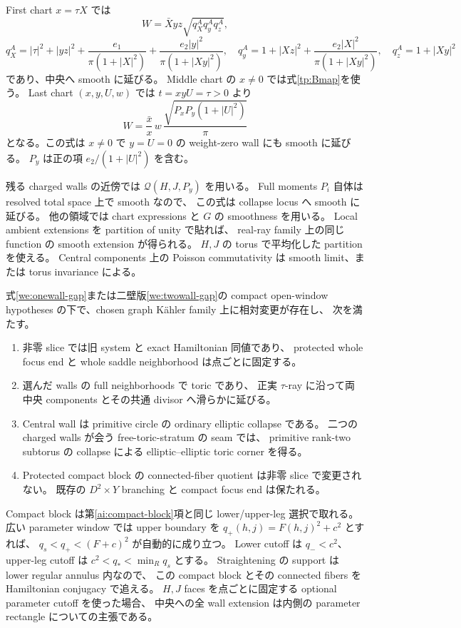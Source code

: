 First chart $x=\tau X$ では
\[
 W=\bar Xyz\sqrt{q_X^Aq_y^Aq_z^A},
\]
\[
 q_X^A=|\tau|^2+|yz|^2+\frac{e_1}{\pi(1+|X|^2)}
                   +\frac{e_2|y|^2}{\pi(1+|Xy|^2)},\quad
 q_y^A=1+|Xz|^2+\frac{e_2|X|^2}{\pi(1+|Xy|^2)},\quad
 q_z^A=1+|Xy|^2
\]
であり、中央へ smooth に延びる。
Middle chart の $x\ne0$ では式\eqref{tp:Bmap}を使う。
Last chart $(x,y,U,w)$ では $t=xyU=\tau>0$ より
\begin{equation}\label{we:last-chart}
 W=\frac{\bar x}{x}\,w\,\frac{\sqrt{P_xP_y(1+|U|^2)}}{\pi}
\end{equation}
となる。この式は $x\ne0$ で $y=U=0$ の weight-zero wall にも smooth に延びる。
$P_y$ は正の項 $e_2/(1+|U|^2)$ を含む。

残る charged walls の近傍では $\mathcal Q(H,J,P_y)$ を用いる。
Full moments $P_i$ 自体は resolved total space 上で smooth なので、
この式は collapse locus へ smooth に延びる。
他の領域では chart expressions と $G$ の smoothness を用いる。
Local ambient extensions を partition of unity で貼れば、
real-ray family 上の同じ function の smooth extension が得られる。
$H,J$ の torus で平均化した partition を使える。
Central components 上の Poisson commutativity は smooth limit、または torus invariance による。

\begin{theorem}\label{we:actual-filling}
式\eqref{we:onewall-gap}または二壁版\eqref{we:twowall-gap}の
compact open-window hypotheses の下で、chosen graph Kähler family 上に相対変更が存在し、
次を満たす。
\begin{enumerate}
\item 非零 slice では旧 system と exact Hamiltonian 同値であり、
 protected whole focus end と whole saddle neighborhood は点ごとに固定する。
\item 選んだ walls の full neighborhoods で toric であり、
 正実 $\tau$-ray に沿って両中央 components とその共通 divisor へ滑らかに延びる。
\item Central wall は primitive circle の ordinary elliptic collapse である。
 二つの charged walls が会う free-toric-stratum の seam では、
 primitive rank-two subtorus の collapse による elliptic--elliptic toric corner を得る。
\item Protected compact block の connected-fiber quotient は非零 slice で変更されない。
 既存の $D^2\times Y$ branching と compact focus end は保たれる。
\end{enumerate}
\end{theorem}

Compact block は第\ref{ai:compact-block}項と同じ lower/upper-leg 選択で取れる。
広い parameter window では upper boundary を $q_+(h,j)=F(h,j)^2+c^2$ とすれば、
$q_s<q_+<(F+c)^2$ が自動的に成り立つ。
Lower cutoff は $q_-<c^2$、upper-leg cutoff は $c^2<q_*<\min_Rq_s$ とする。
Straightening の support は lower regular annulus 内なので、
この compact block とその connected fibers を Hamiltonian conjugacy で追える。
$H,J$ faces を点ごとに固定する optional parameter cutoff を使った場合、
中央への全 wall extension は内側の parameter rectangle についての主張である。

